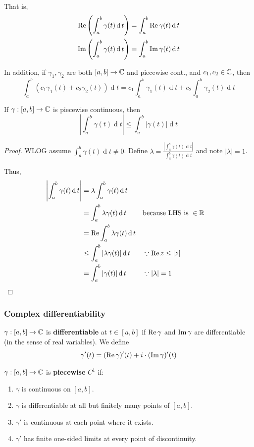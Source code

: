 \documentclass[12pt]{article}
\renewcommand{\d}{\ensuremath{\operatorname{d}}}
\begin{document}
That is, \begin{align*}
    \re \left(\int_{a}^{b}\gamma(t)\d t\right)&=\int_{a}^{b}\re \gamma(t)\d t\\
    \im \left(\int_{a}^{b}\gamma(t)\d t\right)&=\int_{a}^{b}\im \gamma(t)\d t\\
\end{align*}

In addition, if $\gamma_1,\gamma_2$ are both $[a,b]\to \mathbb{C}$ and piecewise cont., and $c_1,c_2\in\mathbb{C}$, then \[\int_{a}^{b}\left( c_1\gamma_1(t)+c_2\gamma_2(t) \right)\d t=c_1\int_{a}^{b}\gamma_1(t)\d t+c_2\int_{a}^{b}\gamma_2(t)\d t\]

\begin{proposition}
    If $\gamma:[a,b]\to \mathbb{C}$ is {piecewise} continuous, then \[\left|\int_{a}^{b}\gamma(t)\d t \right|\leq \int_{a}^{b}|\gamma(t)|\d t \]
\end{proposition}
\begin{proof}
    WLOG assume $ \int_{a}^{b}\gamma(t)\d t \neq 0$. Define $\lambda = \frac{\left|\int_{a}^{b}\gamma(t)\d t\right|}{\int_{a}^{b}\gamma(t)\d t}$ and note $|\lambda|=1$.

    Thus, \begin{align*}
        \left|\int_{a}^{b}\gamma(t)\d t\right| &= \lambda\int_{a}^{b}\gamma(t)\d t\\
        &= \int_{a}^{b}\lambda\gamma(t)\d t &&\text{because LHS is }\in \R\\
        &= \re \int_{a}^{b}\lambda\gamma(t)\d t\\
        &\leq \int_{a}^{b}|\lambda\gamma(t)|\d t &&\because \re z\leq |z|\\
        &= \int_{a}^{b}|\gamma(t)|\d t&& \because |\lambda|=1
    \end{align*}
\end{proof}

\subsubsection{Complex differentiability}
 $\gamma:[a,b]\to \mathbb{C}$ is \textbf{differentiable} at $t\in [a,b]$ if $\operatorname{Re} \gamma$ and $\operatorname{Im} \gamma$ are differentiable (in the sense of real variables). We define \[\gamma'(t)=(\operatorname{Re} \gamma)'(t)+i\cdot (\operatorname{Im} \gamma)'(t)\]

 $\gamma:[a,b]\to \mathbb{C}$ is \textbf{piecewise} $C^1$ if: \begin{enumerate}[label=(\alph*)]
    \item $\gamma$ is continuous on $[a,b]$.
    \item $\gamma$ is differentiable at all but finitely many points of $[a,b]$.
    \item $\gamma'$ is continuous at each point where it exists.
    \item $\gamma'$ has finite one-sided limits at every point of discontinuity.
\end{enumerate}
\end{document}
